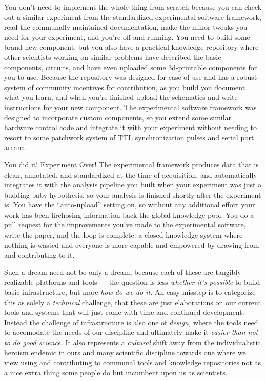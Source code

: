 \documentclass[nohyper]{tufte-book-jls}
\begin{document}
You don't need to implement the whole thing from scratch because you can
check out a similar experiment from the standardized experimental
software framework, read the communally maintained documentation, make
the minor tweaks you need for your experiment, and you're off and
running. You need to build some brand new component, but you also have a
practical knowledge repository where other scientists working on similar
problems have described the basic components, circuits, and have even
uploaded some 3d-printable components for you to use. Because the
repository was designed for ease of use and has a robust system of
community incentives for contribution, as you build you document what
you learn, and when you're finished upload the schematics and write
instructions for your new component. The experimental software framework
was designed to incorporate custom components, so you extend some
similar hardware control code and integrate it with your experiment
without needing to resort to some patchwork system of TTL
synchronization pulses and serial port arcana.

You did it! Experiment Over! The experimental framework produces data
that is clean, annotated, and standardized at the time of acquisition,
and automatically integrates it with the analysis pipeline you built
when your experiment was just a budding baby hypothesis, so your
analysis is finished shortly after the experiment is. You have the
``auto-upload'' setting on, so without any additional effort your work
has been firehosing information back the global knowledge pool. You do a
pull request for the improvements you've made to the experimental
software, write the paper, and the loop is complete: a closed knowledge
system where nothing is wasted and everyone is more capable and
empowered by drawing from and contributing to it.

Such a dream need not be only a dream, because each of these are
tangibly realizable platforms and tools --- the question is less
\emph{whether it's possible} to build basic infrastructure, but more
\emph{how do we do it.} An easy misstep is to categorize this as solely
a \emph{technical} challenge, that these are just elaborations on our
current tools and systems that will just come with time and continued
development. Instead the challenge of infrastructure is also one of
\emph{design,} where the tools need to accomodate the needs of our
discipline and ultimately make it \emph{easier than not to do good
science.} It also represents a \emph{cultural} shift away from the
individualistic heroism endemic in ours and many scientific discipline
towards one where we view using and contributing to communal tools and
knowledge repositories not as a nice extra thing some people do but
incumbent upon us as scientists.
\end{document}
